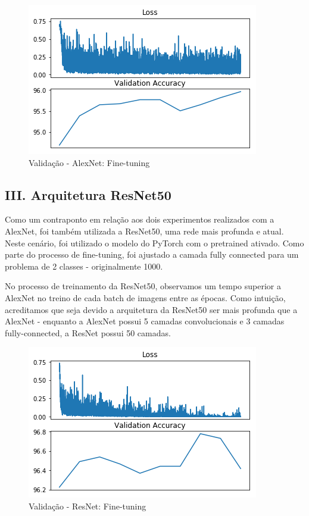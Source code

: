 \documentclass{sigchi}
\begin{document}
\begin{figure}[ht!]
\centering
\includegraphics[scale=0.5]{./figures/alexnet-finetunning.png}
\caption{Validação - AlexNet: Fine-tuning}
\label{fig:alexnet-finetuning}
\end{figure}

\subsection{III. Arquitetura ResNet50}
Como um contraponto em relação aos dois experimentos realizados com a AlexNet, foi também utilizada a ResNet50, uma rede mais profunda e atual. Neste cenário, foi utilizado o modelo do PyTorch com o pretrained ativado. Como parte do processo de fine-tuning, foi ajustado a camada fully connected para um problema de 2 classes - originalmente 1000.

No processo de treinamento da ResNet50, observamos um tempo superior a AlexNet no treino de cada batch de imagens entre as épocas. Como intuição, acreditamos que seja devido a arquitetura da ResNet50 ser mais profunda que a AlexNet - enquanto a AlexNet possui 5 camadas convolucionais e 3 camadas fully-connected, a ResNet possui 50 camadas.


\begin{figure}[ht!]
\centering
\includegraphics[scale=0.5]{./figures/resnet50.png}
\caption{Validação - ResNet: Fine-tuning}
\label{fig:resnet-finetuning}
\end{figure}
\end{document}
